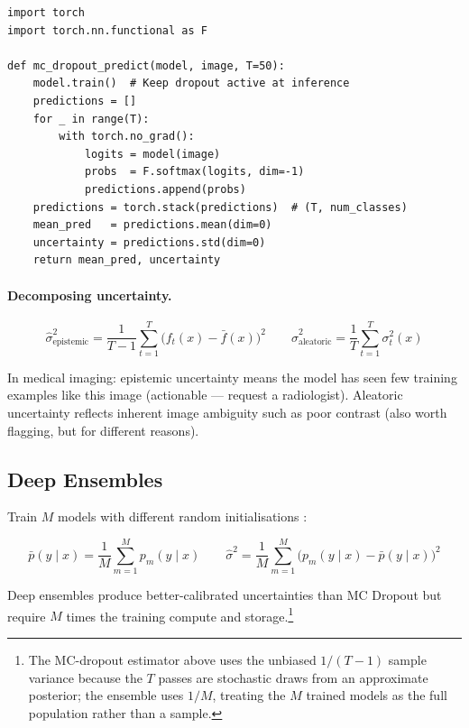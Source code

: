 \begin{lstlisting}[style=python, caption={MC Dropout uncertainty estimation for vision}]
import torch
import torch.nn.functional as F

def mc_dropout_predict(model, image, T=50):
    model.train()  # Keep dropout active at inference
    predictions = []
    for _ in range(T):
        with torch.no_grad():
            logits = model(image)
            probs  = F.softmax(logits, dim=-1)
            predictions.append(probs)
    predictions = torch.stack(predictions)  # (T, num_classes)
    mean_pred   = predictions.mean(dim=0)
    uncertainty = predictions.std(dim=0)
    return mean_pred, uncertainty
\end{lstlisting}

\paragraph{Decomposing uncertainty.}

\[
\hat{\sigma}^2_\text{epistemic}  = \frac{1}{T-1}\sum_{t=1}^{T}\bigl(f_t(x) - \bar{f}(x)\bigr)^2
\qquad
\hat{\sigma}^2_\text{aleatoric} = \frac{1}{T}\sum_{t=1}^{T}\sigma_t^2(x)
\]

In medical imaging: epistemic uncertainty means the model has seen few training examples like this image (actionable — request a radiologist). Aleatoric uncertainty reflects inherent image ambiguity such as poor contrast (also worth flagging, but for different reasons).

\subsection{Deep Ensembles}

Train $M$ models with different random initialisations \autocite{lakshminarayanan2017simple}:

\[
\bar{p}(y \mid x) = \frac{1}{M}\sum_{m=1}^{M} p_m(y \mid x)
\qquad
\hat{\sigma}^2 = \frac{1}{M}\sum_{m=1}^{M}\bigl(p_m(y\mid x) - \bar{p}(y\mid x)\bigr)^2
\]

Deep ensembles produce better-calibrated uncertainties than MC Dropout but require $M$ times the training compute and storage.\footnote{The MC-dropout estimator above uses the unbiased $1/(T-1)$ sample variance because the $T$ passes are stochastic draws from an approximate posterior; the ensemble uses $1/M$, treating the $M$ trained models as the full population rather than a sample.}

